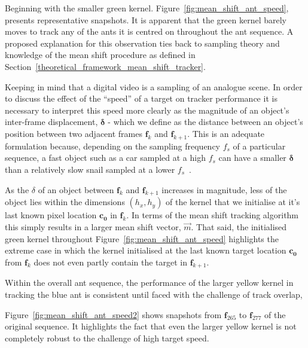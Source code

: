 Beginning with the smaller green kernel.
Figure~\ref{fig:mean_shift_ant_speed}, presents representative snapshots. 
It is apparent that the green kernel barely moves to track any of the ants it is
centred on throughout the ant sequence. A proposed explanation for this
observation ties back to sampling theory and knowledge of the mean shift
procedure as defined in Section~\ref{theoretical_framework_mean_shift_tracker}.

Keeping in mind that a digital video is a sampling of an analogue scene.
In order to discuss the effect of the ``speed'' of a target on tracker
performance it is necessary to interpret this speed more clearly
as the magnitude of an object's inter-frame displacement, $\mathbf{\delta}$ - which
we define as the distance between an object's
position between two adjacent frames $\mathbf{f}_k$ and $\mathbf{f}_{k+1}$.
This is an adequate formulation because, depending on the sampling frequency $f_s$ of
a particular sequence, a fast object such as a car sampled at a high $f_s$ can
have a smaller $\mathbf{\delta}$ than a relatively slow snail sampled at a lower
$f_s$~\cite{Tekalp2014}. 

As the $\delta$ of an object between $\mathbf{f}_k$ and $\mathbf{f}_{k+1}$ 
increases in magnitude, less of the object lies within the dimensions
$(h_x,h_y)$ of the kernel that we initialise at it's last known pixel location
$\mathbf{c_0}$ in $\mathbf{f}_k$. In terms of the mean shift tracking algorithm this simply
results in a larger mean shift vector, $\vec{m}$. That said, the initialised green kernel
throughout Figure~\ref{fig:mean_shift_ant_speed} highlights the extreme case in
which the kernel initialised at the last known target location $\mathbf{c_0}$
from $\mathbf{f}_{k}$ does not even partly contain the target in
$\mathbf{f}_{k+1}$.

Within the overall ant sequence, the performance of the larger yellow kernel in
tracking the blue ant is consistent until faced with the challenge
of track overlap, 

Figure~\ref{fig:mean_shift_ant_speed2} shows snapshots from $\mathbf{f}_{265}$ to
$\mathbf{f}_{277}$ of the original sequence. It highlights the fact that even the larger
yellow kernel is not completely robust to the challenge of high target speed. 

